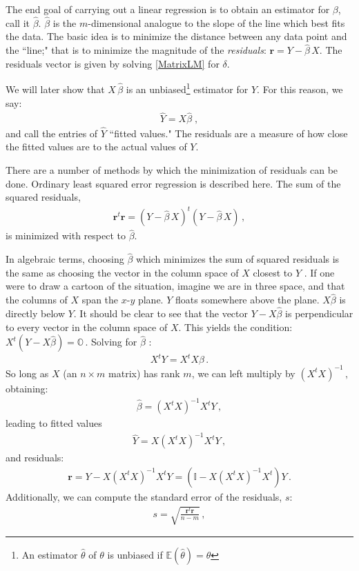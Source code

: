 The end goal of carrying out a linear regression is to obtain an estimator for $\beta$, call it $\hat{\beta}$. $\hat{\beta}$ is the $m$-dimensional analogue to the slope of the line which best fits the data. The basic idea is to minimize the distance between any data point and the ``line;" that is to minimize the magnitude of the \emph{residuals}: $\mathbf{r} = Y-\hat{\beta} \,X$. The residuals vector is given by solving \ref{MatrixLM} for $\delta$. 

We will later show that $X \, \hat{\beta}$ is an unbiased\footnote{ An estimator $\hat{\theta}$ of $\theta$ is unbiased if $\mathbb{E}(\hat{\theta}) = \theta$} estimator for $Y$. For this reason, we say: \begin{eqnarray} \label{fitted} \hat{Y} = X \hat{\beta}\;, \end{eqnarray}and call the entries of $\hat{Y}$ ``fitted values." The residuals are a measure of how close the fitted values are to the actual values of $Y$.

There are a number of methods by which the minimization of residuals can be done. Ordinary least squared error regression is described here. The sum of the squared residuals, \begin{eqnarray} \label{squaredresidual} \mathbf{r}^t\mathbf{r}=(Y-\hat{\beta} \,X)^t(Y-\hat{\beta} \,X) \,,\end{eqnarray} is minimized with respect to $\hat{\beta}$. 

In algebraic terms, choosing $\hat{\beta}$ which minimizes the sum of squared residuals is the same as choosing the vector in the column space of $X$ closest to $Y$ \cite{Regression}.  If one were to draw a cartoon of the situation, imagine we are in three space, and that the columns of $X$ span the $x$-$y$ plane. $Y$ floats somewhere above the plane. $X \hat{\beta}$ is directly below $Y$. It should be clear to see that the vector $Y - X \hat{\beta}$ is perpendicular to every vector in the column space of $X$. This yields the condition: 
$ X^t (Y - X\hat{\beta}) = \mathbb{O}\,. $ 
Solving for $\hat{\beta}$ :
\[  X^t Y = X^t X \hat{\beta} \,.\]
So long as $X$ (an $n \times m$ matrix) has rank $m$, we can left multiply by $(X^t X)^{-1}\,,$ obtaining:
\begin{eqnarray} \label{CoeffEst} \hat{\beta} = (X^t X)^{-1} X^t Y\,,\end{eqnarray}
leading to fitted values 
\begin{eqnarray} \label{Fitted}
 \hat{Y} =  X (X^t X)^{-1} X^t Y \,,
 \end{eqnarray}
 and residuals: 
\begin{eqnarray} \label{residual}
 \mathbf{r} = Y - X (X^t X)^{-1} X^t Y = (\mathbb{I} - X (X^t X)^{-1} X^t )Y\,. 
 \end{eqnarray}
 Additionally, we can compute the standard error of the residuals, $s$:
 \begin{eqnarray} 
 \label{s2} s = \sqrt{ \frac{\mathbf{r}^t\mathbf{r}}{n-m} }\,,
 \end{eqnarray}  
 
